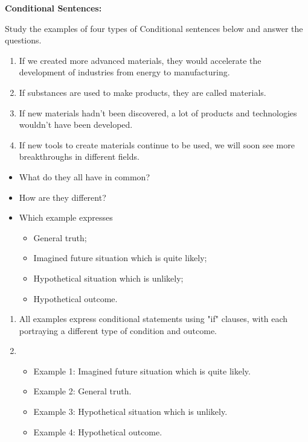 \textbf{Conditional Sentences:}

Study the examples of four types of Conditional sentences below and answer the questions.

\begin{enumerate}
      \item If we created more advanced materials, they would accelerate the development of industries from energy to manufacturing.
      \item If substances are used to make products, they are called materials.
      \item If new materials hadn’t been discovered, a lot of products and technologies wouldn’t have been developed.
      \item If new tools to create materials continue to be used, we will soon see more breakthroughs in different fields.
\end{enumerate}

\begin{itemize}
      \item What do they all have in common?
      \item How are they different?
      \item Which example expresses
            \begin{itemize}
                  \item General truth;
                  \item Imagined future situation which is quite likely;
                  \item Hypothetical situation which is unlikely;
                  \item Hypothetical outcome.
            \end{itemize}
\end{itemize}

\begin{enumerate}
      \item All examples express conditional statements using "if" clauses, with each portraying a different type of condition and outcome.
      \item
            \begin{itemize}
                  \item Example 1: Imagined future situation which is quite likely.
                  \item Example 2: General truth.
                  \item Example 3: Hypothetical situation which is unlikely.
                  \item Example 4: Hypothetical outcome.
            \end{itemize}
\end{enumerate}

